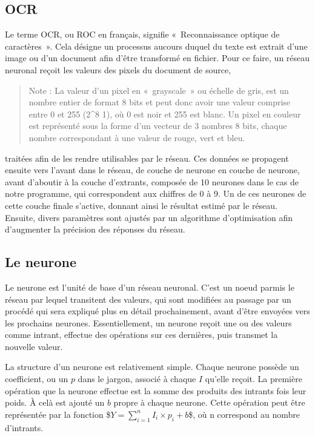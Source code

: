 \documentclass[letterpaper,10pt,french]{sphinxmanual}
\begin{document}
\subsection{OCR}
\label{\detokenize{OCR_SAM:ocr}}
Le terme OCR, ou ROC en français, signifie « Reconnaissance optique de caractères ». Cela désigne un processus aucours duquel du texte est extrait
d’une image ou d’un document afin d’être transformé en fichier. Pour ce faire, un réseau neuronal reçoit les valeurs des pixels du document de source,
\begin{quote}

Note : La valeur d’un pixel en « grayscale » ou échelle de gris, est un nombre entier
de format 8 bits et peut donc avoir
une valeur comprise entre 0 et 255 (2\textasciicircum{}8 \sphinxhyphen{} 1), où 0 est noir et 255 est blanc.
Un pixel en couleur est représenté sous la forme d’un vecteur de 3 nombres 8
bits, chaque nombre correspondant à une valeur de rouge, vert et bleu. 
\end{quote}

traitées afin de les rendre utilisables par le réseau. Ces données se propagent ensuite vers l’avant
dans le réseau, de couche de neurone en couche de neurone, avant d’aboutir à la couche d’extrants, composée de 10 neurones dans le cas de notre
programme, qui correspondent aux chiffres de 0 à 9. Un de ces neurones de cette couche finale s’active, donnant ainsi le résultat estimé par le réseau.
Ensuite, divers paramètres sont ajustés par un algorithme d’optimisation afin d’augmenter la précision des réponses du réseau.


\subsection{Le neurone}
\label{\detokenize{OCR_SAM:le-neurone}}
Le neurone est l’unité de base d’un réseau neuronal. C’est un noeud parmis le réseau par lequel transitent des valeurs, qui sont modifiées
au passage par un procédé qui sera expliqué plus en détail prochainement, avant d’être envoyées vers les prochains neurones.
Essentiellement, un neurone reçoit une ou des valeurs comme intrant, effectue des opérations sur ces dernières, puis transmet la nouvelle valeur.

La structure d’un neurone est relativement simple. Chaque neurone possède un coefficient, ou un  \(p\) dans le jargon, associé à chaque  \(I\) qu’elle reçoit.
La première opération que la neurone effectue est la somme des produits des intrants fois leur poids. À celà est ajouté un  \(b\) propre à chaque neurone.
Cette opération peut être représentée par la fonction \$\(Y = \sum_{i=1}^{n} I_i \times p_i + b\)\$, où n correspond au nombre d’intrants.
\end{document}
